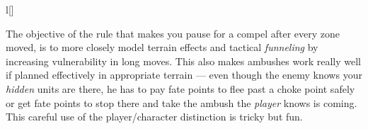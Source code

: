 \begin{wrapfigure}[14]{l}[\sidebarwidth]{\halfbarwidth}
\begin{shadebox}{\halfbarinnerwidth}

The objective of the rule that makes you pause for a compel after every zone moved, is to more closely model terrain effects and tactical \emph{funneling} by increasing vulnerability in long moves. This also makes ambushes work really well if planned effectively in appropriate terrain --- even though the enemy knows your \emph{hidden} units are there, he has to pay fate points to flee past a choke point safely or get fate points to stop there and take the ambush the \emph{player} knows is coming. This careful use of the player/character distinction is tricky but fun.
\end{shadebox}
\end{wrapfigure}
